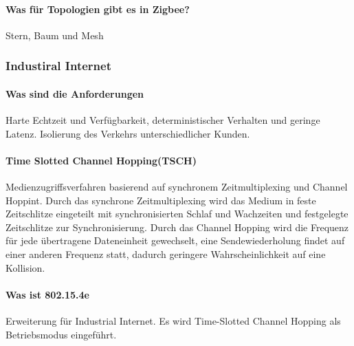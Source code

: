 	\paragraph{Was für Topologien gibt es in Zigbee?}
	Stern, Baum und Mesh
	
\subsubsection{Industiral Internet}
	\paragraph{Was sind die Anforderungen}
	Harte Echtzeit und Verfügbarkeit, deterministischer Verhalten und geringe Latenz. Isolierung des Verkehrs unterschiedlicher Kunden.
	
	\paragraph{Time Slotted Channel Hopping(TSCH)}
	Medienzugriffsverfahren basierend auf synchronem Zeitmultiplexing und Channel Hoppint. 
	Durch das synchrone Zeitmultiplexing wird das Medium in feste Zeitschlitze eingeteilt	mit synchronisierten Schlaf und Wachzeiten und festgelegte Zeitschlitze zur Synchronisierung.
	Durch das Channel Hopping wird die Frequenz für jede übertragene Dateneinheit gewechselt, eine Sendewiederholung findet auf einer anderen Frequenz statt, dadurch geringere Wahrscheinlichkeit auf eine Kollision.
	
	\paragraph{Was ist 802.15.4e}
	Erweiterung für Industrial Internet. Es wird Time-Slotted Channel Hopping als Betriebsmodus eingeführt.